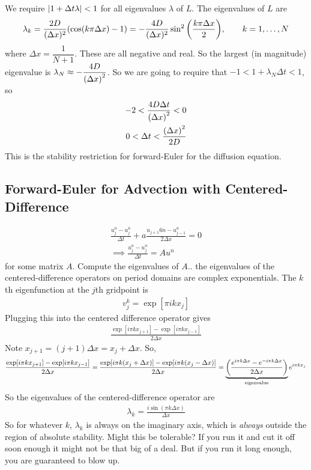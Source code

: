 \documentclass{article}
\newcommand{\Dx}{\Delta x}
\newcommand{\Dt}{\Delta t}
\begin{document}
            We require $\abs{1 + \Dt\lambda} < 1$ for all eigenvalues $\lambda$ of $L$.  The eigenvalues of $L$ are
            \begin{align*}
                \lambda_k = \frac{2D}{(\Dx)^2}\qty(\cos(k\pi\Dx) - 1) = -\frac{4D}{(\Dx)^2}\sin^2\qty(\frac{k\pi\Dx}{2}),\qquad k = 1,\dots,N
            \end{align*}
            where $\Dx = \dfrac{1}{N+1}$.  These are all negative and real.  So the largest (in magnitude) eigenvalue is $\lambda_N \approx -\dfrac{4D}{\qty(\Dx)^2}$.  So we are going to require that $-1 < 1 + \lambda_N\Dt < 1$, so
            \begin{align*}
                -2 < \frac{4D\Dt}{\qty(\Dx)^2} < 0 \\
                0 < \Dt < \frac{\qty(\Dx)^2}{2D}
            \end{align*}
            This is the stability restriction for forward-Euler for the diffusion equation.

        \subsection{Forward-Euler for Advection with Centered-Difference}

            \begin{align*}
                \frac{u_j^{n} - u_j^n}{\Dt} + a\frac{u_{j+1}6n - u_{j-1}^n}{2\Dx} = 0 \\
                \implies \frac{u_j^{n} - u_j^n}{\Dt} = Au^n
            \end{align*}
            for some matrix $A$.  Compute the eigenvalues of $A$.. the eigenvalues of the centered-difference operators on period domains are complex exponentials.  The $k$th eigenfunction at the $j$th gridpoint is
            \begin{align*}
                v^k_j = \exp[\pi i k x_j]
            \end{align*}
            Plugging this into the centered difference operator gives
            \begin{align*}
                \frac{\exp[i\pi k x_{j+1}] - \exp[i\pi k x_{j-1}]}{2\Dx}
            \end{align*}
            Note $x_{j+1} = (j+1)\Dx = x_j + \Dx$.  So,
            \begin{align*}
                \frac{\exp[i\pi k x_{j+1}] - \exp[i\pi k x_{j-1}]}{2\Dx} = \frac{\exp[i\pi k(x_j + \Dx)] - \exp[i\pi k (x_j - \Dx)]}{2\Dx} = \underbrace{\qty(\frac{e^{i\pi k\Dx} - e^{-i\pi k\Dx}}{2\Dx})}_{\text{eigenvalue}}e^{i\pi k x_j}
            \end{align*}
            So the eigenvalues of the centered-difference operator are
            \begin{align*}
                \lambda_k = \frac{i\sin(\pi k \Dx)}{\Dx}
            \end{align*}
            So for whatever $k$, $\lambda_k$ is always on the imaginary axis, which is \emph{always} outside the region of absolute stability.  Might this be tolerable?  If you run it and cut it off soon enough it might not be that big of a deal.  But if you run it long enough, you are guaranteed to blow up.
\end{document}
